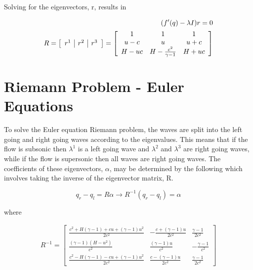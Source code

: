 \documentclass{article}%
\numberwithin{equation}{section}
\begin{document}
Solving for the eigenvectors, r, results in

\begin{equation}
\begin{split}
(f'(q) - \lambda I) r = 0 \\
R = \left[ \begin{array}{c |c | c} r^1 & r^2 & r^3 \end{array} \right]= \left[ \begin{array}{ccc} 1 & 1 & 1 \\ u- c & u  & u + c \\ H - u c &  H - \frac{c^2}{\gamma - 1} & H + u c   \end{array} \right] 
\end{split}
\end{equation}

\section{Riemann Problem - Euler Equations}
To solve the Euler equation Riemann problem, the waves are split into the left going and right going waves according to the eigenvalues. This means that if the flow is subsonic then $\lambda^1$ is a left going wave and $\lambda^2$ and $\lambda^3$ are right going waves, while if the flow is supersonic then all waves are right going waves. The coefficients of these eigenvectors, $\alpha$, may be determined by the following which involves taking the inverse of the eigenvector matrix, R.

\begin{equation}
q_r - q_l = R \alpha \rightarrow R^{-1} (q_r - q_l) = \alpha \label{alphaeqn}
\end{equation}

where 

\begin{equation}
\begin{split}
R^{-1} = \left[ \begin{array}{ccc} \frac{c^2 + H (\gamma-1) + c u + (\gamma-1) u^2}{2 c^2} & -\frac{c + (\gamma - 1) u}{2 c^2} & \frac{\gamma - 1}{2 c^2} \\ \frac{ (\gamma - 1) (H - u^2)}{c^2} & \frac{(\gamma - 1) u}{c^2} & - \frac{\gamma - 1}{c^2} \\   \frac{c^2 - H (\gamma - 1) - c u + (\gamma - 1) u^2}{2 c^2} & \frac{c - (\gamma - 1) u}{2 c^2} & \frac{\gamma - 1}{2 c^2} \end{array} \right] \\ 
\end{split}
\end{equation}
\end{document}
